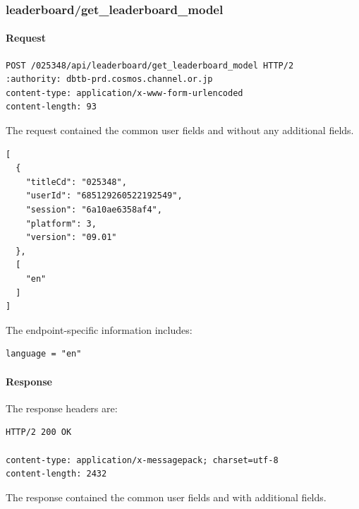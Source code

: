 \subsubsection{leaderboard/get\_leaderboard\_model}
\label{subsec:api_leaderboard_get_leaderboard_model}

\paragraph{Request}

\begin{lstlisting}
POST /025348/api/leaderboard/get_leaderboard_model HTTP/2
:authority: dbtb-prd.cosmos.channel.or.jp
content-type: application/x-www-form-urlencoded
content-length: 93
\end{lstlisting}

The request contained the common user fields and without any additional fields.

\begin{lstlisting}
[
  {
    "titleCd": "025348",
    "userId": "685129260522192549",
    "session": "6a10ae6358af4",
    "platform": 3,
    "version": "09.01"
  },
  [
    "en"
  ]
]
\end{lstlisting}

The endpoint-specific information includes:

\begin{lstlisting}
language = "en"
\end{lstlisting}

\newpage

\paragraph{Response}

The response headers are:

\begin{lstlisting}
HTTP/2 200 OK

content-type: application/x-messagepack; charset=utf-8
content-length: 2432
\end{lstlisting}

The response contained the common user fields and with additional fields.

